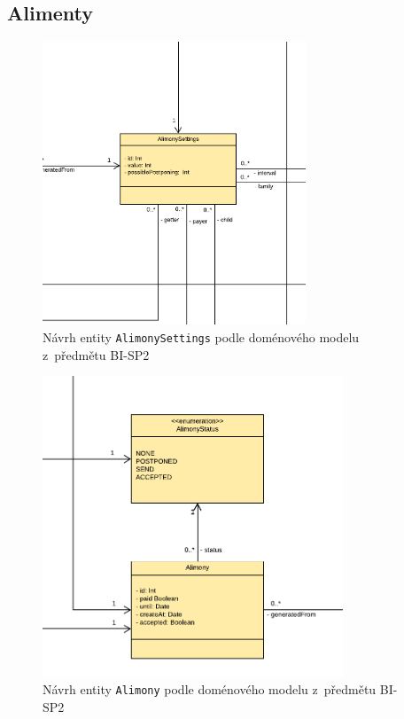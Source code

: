         
    \subsection{Alimenty}
        \begin{figure}\centering
	        \includegraphics[width=0.7\textwidth]{pdfs/AlimonySettings1}
	        \caption[Návrh entity \texttt{AlimonySettings}]{Návrh entity \texttt{AlimonySettings} podle doménového modelu z~předmětu BI-SP2}\label{image:AlimonySettings1}
        \end{figure}
        \begin{figure}\centering
	        \includegraphics[width=0.8\textwidth]{pdfs/Alimony1}
	        \caption[Návrh entity \texttt{Alimony}]{Návrh entity \texttt{Alimony} podle doménového modelu z~předmětu BI-SP2}\label{image:Alimony1}
        \end{figure}
